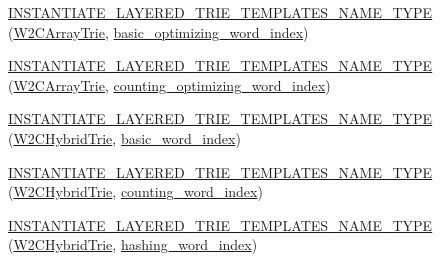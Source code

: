 \begin{DoxyCompactItemize}
\item 
\hyperlink{namespaceuva_1_1smt_1_1bpbd_1_1server_1_1lm_a7cca434d107a3a6eb60e7a74d864a836}{I\+N\+S\+T\+A\+N\+T\+I\+A\+T\+E\+\_\+\+L\+A\+Y\+E\+R\+E\+D\+\_\+\+T\+R\+I\+E\+\_\+\+T\+E\+M\+P\+L\+A\+T\+E\+S\+\_\+\+N\+A\+M\+E\+\_\+\+T\+Y\+P\+E} (\hyperlink{classuva_1_1smt_1_1bpbd_1_1server_1_1lm_1_1_w2_c_array_trie}{W2\+C\+Array\+Trie}, \hyperlink{namespaceuva_1_1smt_1_1bpbd_1_1server_1_1lm_1_1dictionary_a3001583c904eec702b4a4125082a7ecd}{basic\+\_\+optimizing\+\_\+word\+\_\+index})
\item 
\hyperlink{namespaceuva_1_1smt_1_1bpbd_1_1server_1_1lm_aa45b86ca10dea5ae4a7ee2b4c69cc6fc}{I\+N\+S\+T\+A\+N\+T\+I\+A\+T\+E\+\_\+\+L\+A\+Y\+E\+R\+E\+D\+\_\+\+T\+R\+I\+E\+\_\+\+T\+E\+M\+P\+L\+A\+T\+E\+S\+\_\+\+N\+A\+M\+E\+\_\+\+T\+Y\+P\+E} (\hyperlink{classuva_1_1smt_1_1bpbd_1_1server_1_1lm_1_1_w2_c_array_trie}{W2\+C\+Array\+Trie}, \hyperlink{namespaceuva_1_1smt_1_1bpbd_1_1server_1_1lm_1_1dictionary_a61cbd647b15de785ccf4cdd26661c366}{counting\+\_\+optimizing\+\_\+word\+\_\+index})
\item 
\hyperlink{namespaceuva_1_1smt_1_1bpbd_1_1server_1_1lm_a0e772cfc9530e291820fb07661f48096}{I\+N\+S\+T\+A\+N\+T\+I\+A\+T\+E\+\_\+\+L\+A\+Y\+E\+R\+E\+D\+\_\+\+T\+R\+I\+E\+\_\+\+T\+E\+M\+P\+L\+A\+T\+E\+S\+\_\+\+N\+A\+M\+E\+\_\+\+T\+Y\+P\+E} (\hyperlink{classuva_1_1smt_1_1bpbd_1_1server_1_1lm_1_1_w2_c_hybrid_trie}{W2\+C\+Hybrid\+Trie}, \hyperlink{classuva_1_1smt_1_1bpbd_1_1server_1_1lm_1_1dictionary_1_1basic__word__index}{basic\+\_\+word\+\_\+index})
\item 
\hyperlink{namespaceuva_1_1smt_1_1bpbd_1_1server_1_1lm_a29983ae980672ea7123bbf66a65da9af}{I\+N\+S\+T\+A\+N\+T\+I\+A\+T\+E\+\_\+\+L\+A\+Y\+E\+R\+E\+D\+\_\+\+T\+R\+I\+E\+\_\+\+T\+E\+M\+P\+L\+A\+T\+E\+S\+\_\+\+N\+A\+M\+E\+\_\+\+T\+Y\+P\+E} (\hyperlink{classuva_1_1smt_1_1bpbd_1_1server_1_1lm_1_1_w2_c_hybrid_trie}{W2\+C\+Hybrid\+Trie}, \hyperlink{classuva_1_1smt_1_1bpbd_1_1server_1_1lm_1_1dictionary_1_1counting__word__index}{counting\+\_\+word\+\_\+index})
\item 
\hyperlink{namespaceuva_1_1smt_1_1bpbd_1_1server_1_1lm_aae7eb655f78df9790bd1bafc4e9319a1}{I\+N\+S\+T\+A\+N\+T\+I\+A\+T\+E\+\_\+\+L\+A\+Y\+E\+R\+E\+D\+\_\+\+T\+R\+I\+E\+\_\+\+T\+E\+M\+P\+L\+A\+T\+E\+S\+\_\+\+N\+A\+M\+E\+\_\+\+T\+Y\+P\+E} (\hyperlink{classuva_1_1smt_1_1bpbd_1_1server_1_1lm_1_1_w2_c_hybrid_trie}{W2\+C\+Hybrid\+Trie}, \hyperlink{classuva_1_1smt_1_1bpbd_1_1server_1_1lm_1_1dictionary_1_1hashing__word__index}{hashing\+\_\+word\+\_\+index})
\item 

\end{DoxyCompactItemize}
